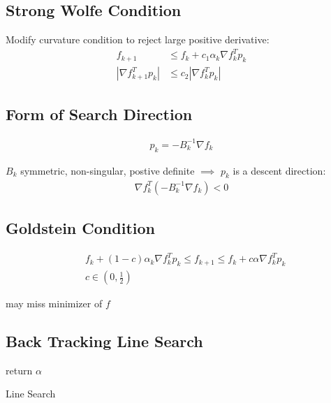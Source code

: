 \documentclass[8pt,letter]{article}
\begin{document}
\begin{multicols*}{2}
  \subsection{Strong Wolfe Condition}
  
  Modify curvature condition to reject large positive derivative:
  \begin{align}
    f_{k+1} & \leq f_k + c_1 \alpha_k \nabla f_k^T p_k\\
    | \nabla f_{k+1}^T p_k| & \leq c_2 |\nabla f_k^T p_k|
  \end{align}
  
  \subsection{Form of Search Direction}
  
  \begin{align}
    p_k = - B_k^{-1} \nabla f_k
  \end{align}
  
  $B_k$ symmetric, non-singular, postive definite $\implies$ $p_k$ is a descent direction:
  \begin{align}
    \nabla f_k^T(-B_k^{-1} \nabla f_k) < 0
  \end{align}

  \subsection{Goldstein Condition}
  
  \begin{align}
    &f_k+(1-c) \alpha_k \nabla f_k^T p_k \leq f_{k+1} \leq f_k + c \alpha \nabla f_k^T p_k\\
    &c \in (0,\frac{1}{2})
  \end{align}

  may miss minimizer of $f$

  \subsection{Back Tracking Line Search}
  
  \begin{algorithm}[H]
    return $\alpha$
    \caption{Line Search\label{Algo_LineSearch}}
  \end{algorithm}
  

\end{multicols*}
\end{document}

